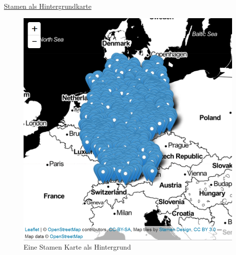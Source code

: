 \documentclass[ignorenonframetext,]{beamer}
\newenvironment{Shaded}{\begin{snugshade}}{\end{snugshade}}
\newcommand{\KeywordTok}[1]{\textcolor[rgb]{0.26,0.66,0.93}{\textbf{#1}}}
\newcommand{\NormalTok}[1]{\textcolor[rgb]{0.74,0.68,0.62}{#1}}
\newcommand{\OperatorTok}[1]{\textcolor[rgb]{0.74,0.68,0.62}{#1}}
\newcommand{\StringTok}[1]{\textcolor[rgb]{0.02,0.61,0.04}{#1}}
\begin{document}
\begin{frame}[fragile]{\href{https://rstudio.github.io/leaflet/basemaps.html}{Stamen
als Hintergrundkarte}}
\protect\hypertarget{stamen-als-hintergrundkarte}{}

\begin{Shaded}
\end{Shaded}

\begin{figure}
\centering
\includegraphics{figure/InteractiveStamen.PNG}
\caption{Eine Stamen Karte als Hintergrund}
\end{figure}

\end{frame}
\end{document}
